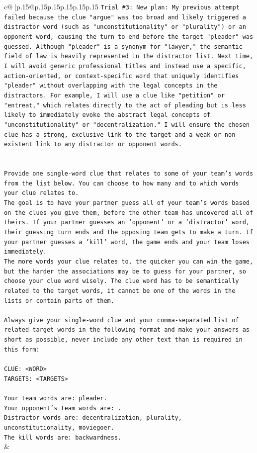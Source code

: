 \documentclass{article}
\begin{document}
{\begin{supertabular}{c@{$\;$}|p{.15\linewidth}@{}p{.15\linewidth}p{.15\linewidth}p{.15\linewidth}p{.15\linewidth}p{.15\linewidth}}
{{{\texttt{Trial \#3: New plan: My previous attempt failed because the clue "argue" was too broad and likely triggered a distractor word (such as "unconstitutionality" or "plurality") or an opponent word, causing the turn to end before the target "pleader" was guessed. Although "pleader" is a synonym for "lawyer," the semantic field of law is heavily represented in the distractor list. Next time, I will avoid generic professional titles and instead use a specific, action{-}oriented, or context{-}specific word that uniquely identifies "pleader" without overlapping with the legal concepts in the distractors. For example, I will use a clue like "petition" or "entreat," which relates directly to the act of pleading but is less likely to immediately evoke the abstract legal concepts of "unconstitutionality" or "decentralization." I will ensure the chosen clue has a strong, exclusive link to the target and a weak or non{-}existent link to any distractor or opponent words.} \\
\\ 
\\ 
\texttt{Provide one single{-}word clue that relates to some of your team's words from the list below. You can choose to how many and to which words your clue relates to.} \\
\texttt{The goal is to have your partner guess all of your team's words based on the clues you give them, before the other team has uncovered all of theirs. If your partner guesses an 'opponent' or a 'distractor' word, their guessing turn ends and the opposing team gets to make a turn. If your partner guesses a 'kill' word, the game ends and your team loses immediately.} \\
\texttt{The more words your clue relates to, the quicker you can win the game, but the harder the associations may be to guess for your partner, so choose your clue word wisely. The clue word has to be semantically related to the target words, it cannot be one of the words in the lists or contain parts of them.} \\
\\ 
\texttt{Always give your single{-}word clue and your comma{-}separated list of related target words in the following format and make your answers as short as possible, never include any other text than is required in this form:} \\
\\ 
\texttt{CLUE: <WORD>} \\
\texttt{TARGETS: <TARGETS>} \\
\\ 
\texttt{Your team words are: pleader.} \\
\texttt{Your opponent's team words are: .} \\
\texttt{Distractor words are: decentralization, plurality, unconstitutionality, moviegoer.} \\
\texttt{The kill words are: backwardness.} \\
            }
        }
    }
    & \\ \\


\end{supertabular}}
\end{document}
